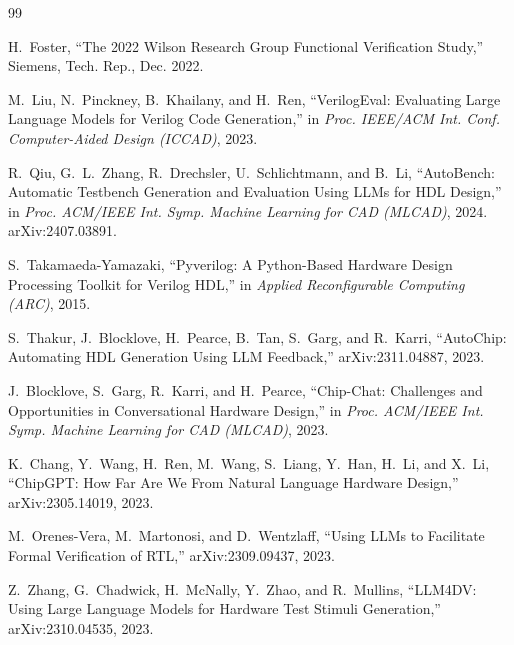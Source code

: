 \documentclass[11pt,a4paper,titlepage=false]{scrreprt}
\begin{document}
{\small
\begingroup
\let\chapter\section


\begin{thebibliography}{99}

H.~Foster,
``The 2022 Wilson Research Group Functional Verification Study,''
Siemens, Tech. Rep., Dec. 2022.

M.~Liu, N.~Pinckney, B.~Khailany, and H.~Ren,
``VerilogEval: Evaluating Large Language Models for Verilog Code Generation,''
in \textit{Proc. IEEE/ACM Int. Conf. Computer-Aided Design (ICCAD)}, 2023.

R.~Qiu, G.~L.~Zhang, R.~Drechsler, U.~Schlichtmann, and B.~Li,
``AutoBench: Automatic Testbench Generation and Evaluation Using LLMs for HDL Design,''
in \textit{Proc. ACM/IEEE Int. Symp. Machine Learning for CAD (MLCAD)}, 2024.
arXiv:2407.03891.

S.~Takamaeda-Yamazaki,
``Pyverilog: A Python-Based Hardware Design Processing Toolkit for Verilog HDL,''
in \textit{Applied Reconfigurable Computing (ARC)}, 2015.

S.~Thakur, J.~Blocklove, H.~Pearce, B.~Tan, S.~Garg, and R.~Karri,
``AutoChip: Automating HDL Generation Using LLM Feedback,''
arXiv:2311.04887, 2023.

J.~Blocklove, S.~Garg, R.~Karri, and H.~Pearce,
``Chip-Chat: Challenges and Opportunities in Conversational Hardware Design,''
in \textit{Proc. ACM/IEEE Int. Symp. Machine Learning for CAD (MLCAD)}, 2023.

K.~Chang, Y.~Wang, H.~Ren, M.~Wang, S.~Liang, Y.~Han, H.~Li, and X.~Li,
``ChipGPT: How Far Are We From Natural Language Hardware Design,''
arXiv:2305.14019, 2023.

M.~Orenes-Vera, M.~Martonosi, and D.~Wentzlaff,
``Using LLMs to Facilitate Formal Verification of RTL,''
arXiv:2309.09437, 2023.

Z.~Zhang, G.~Chadwick, H.~McNally, Y.~Zhao, and R.~Mullins,
``LLM4DV: Using Large Language Models for Hardware Test Stimuli Generation,''
arXiv:2310.04535, 2023.


\end{thebibliography}}
\end{document}
